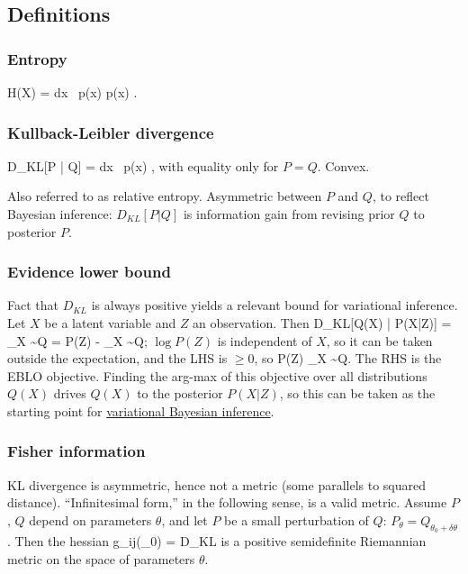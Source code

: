 \documentclass[notitlepage,openany,11pt]{report}
\theoremstyle{plain}%
\numberwithin{equation}{section}
\begin{document}
\subsection{Definitions}

\subsubsection{Entropy}
\be
H(X) = \int\! dx \, p(x) \log p(x) .
\ee

\subsubsection{Kullback-Leibler divergence}
\be
D_{KL}[P | Q] = \int\! dx \, p(x) \log {} ,
\ee
with equality only for $P=Q$. Convex.

Also referred to as relative entropy. Asymmetric between $P$ and $Q$, to reflect Bayesian inference: $D_{KL}[P | Q]$ is information gain from revising prior $Q$ to posterior $P$.

\subsubsection{Evidence lower bound}
Fact that $D_{KL}$ is always positive yields a relevant bound for variational inference. Let $X$ be a latent variable and $Z$ an observation. Then
\be
D_{KL}[Q(X) | P(X|Z)] = \left\langle \log {} \right\rangle_{X \sim Q} = \left\langle \log P(Z) - \log {} \right\rangle_{X \sim Q};
\ee
$\log P(Z)$ is independent of $X$, so it can be taken outside the expectation, and the LHS is $\geq 0$, so 
\be
\log P(Z) \geq \left\langle \log {} \right\rangle_{X \sim Q}.
\ee
The RHS is the EBLO objective. Finding the arg-max of this objective over all distributions $Q(X)$ drives $Q(X)$ to the posterior $P(X|Z)$, so this can be taken as the starting point for \href{https://en.wikipedia.org/wiki/Variational_Bayesian_methods}{variational Bayesian inference}. 


\subsubsection{Fisher information}

KL divergence is asymmetric, hence not a metric (some parallels to squared distance). ``Infinitesimal form,'' in the following sense, is a valid metric. Assume $P$, $Q$ depend on parameters $\theta$, and let $P$ be a small perturbation of $Q$: $P_{\theta} = Q_{\theta_{0} + \delta \theta}$. Then the hessian
\be
g_{ij}(\theta_{0}) =  D_{KL}
\ee
is a positive semidefinite Riemannian metric on the space of parameters $\theta$.
\end{document}
